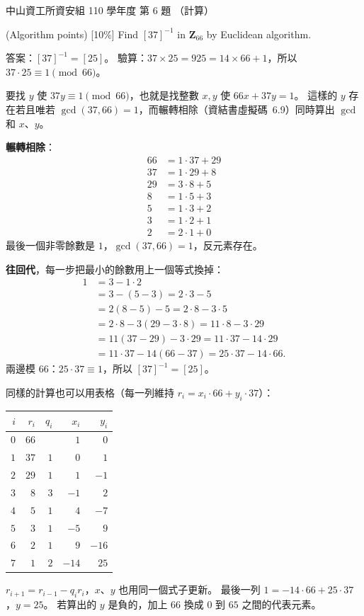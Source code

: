\begin{pastexam}[label={px:nsysu-110-dmalg-02}]{中山資工所資安組 110 學年度 第 6 題}
（計算）

(Algorithm points) {[10\%]} Find $[37]^{-1}$ in $\boldsymbol{Z}_{66}$ by Euclidean algorithm.
\end{pastexam}

\begin{pastsoln}
答案：$[37]^{-1} = [25]$。 驗算：$37 \times 25 = 925 = 14 \times 66 + 1$，所以 $37 \cdot 25 \equiv 1 \pmod{66}$。

要找 $y$ 使 $37y \equiv 1 \pmod{66}$，也就是找整數 $x, y$ 使 $66x + 37y = 1$。 這樣的 $y$ 存在若且唯若
$\gcd(37, 66) = 1$，而輾轉相除（資結書虛擬碼~6.9）同時算出 $\gcd$ 和 $x$、$y$。

\textbf{輾轉相除}：
\begin{align*}
66 &= 1 \cdot 37 + 29\\
37 &= 1 \cdot 29 + 8\\
29 &= 3 \cdot 8 + 5\\
8 &= 1 \cdot 5 + 3\\
5 &= 1 \cdot 3 + 2\\
3 &= 1 \cdot 2 + 1\\
2 &= 2 \cdot 1 + 0
\end{align*}
最後一個非零餘數是 $1$，$\gcd(37, 66) = 1$，反元素存在。

\textbf{往回代}，每一步把最小的餘數用上一個等式換掉：
\begin{align*}
1 &= 3 - 1 \cdot 2\\
&= 3 - (5 - 3) = 2 \cdot 3 - 5\\
&= 2(8 - 5) - 5 = 2 \cdot 8 - 3 \cdot 5\\
&= 2 \cdot 8 - 3(29 - 3 \cdot 8) = 11 \cdot 8 - 3 \cdot 29\\
&= 11(37 - 29) - 3 \cdot 29 = 11 \cdot 37 - 14 \cdot 29\\
&= 11 \cdot 37 - 14(66 - 37) = 25 \cdot 37 - 14 \cdot 66 .
\end{align*}
兩邊模 $66$：$25 \cdot 37 \equiv 1$，所以 $[37]^{-1} = [25]$。

同樣的計算也可以用表格（每一列維持 $r_i = x_i \cdot 66 + y_i \cdot 37$）：
\begin{center}
\begin{tabular}{rrrrr}
\toprule
$i$ & $r_i$ & $q_i$ & $x_i$ & $y_i$ \\
\midrule
$0$ & $66$ & & $1$ & $0$ \\
$1$ & $37$ & $1$ & $0$ & $1$ \\
$2$ & $29$ & $1$ & $1$ & $-1$ \\
$3$ & $8$ & $3$ & $-1$ & $2$ \\
$4$ & $5$ & $1$ & $4$ & $-7$ \\
$5$ & $3$ & $1$ & $-5$ & $9$ \\
$6$ & $2$ & $1$ & $9$ & $-16$ \\
$7$ & $1$ & $2$ & $-14$ & $25$ \\
\bottomrule
\end{tabular}
\end{center}
$r_{i+1} = r_{i-1} - q_i r_i$，$x$、$y$ 也用同一個式子更新。 最後一列 $1 = -14 \cdot 66 + 25 \cdot 37$，$y = 25$。 若算出的
$y$ 是負的，加上 $66$ 換成 $0$ 到 $65$ 之間的代表元素。
\end{pastsoln}
